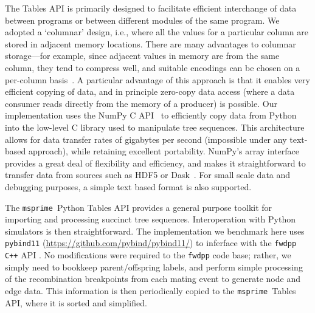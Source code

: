\documentclass{article}
\newcommand{\fwdpp}{\texttt{fwdpp}}
\newcommand{\cpp}{\texttt{C++}}
\newcommand{\msprime}{\texttt{msprime}}
\begin{document}
The Tables API is primarily designed to facilitate efficient interchange of
data between programs or between different modules of the same program. We
adopted a `columnar' design, i.e., where all the values for a
particular column are stored in adjacent memory locations.
There are many advantages to columnar storage---for example, since adjacent
values in memory are from the same column, they tend to compress well,
and suitable encodings can be chosen on a per-column basis~\citep{abadi2006integrating}.
A particular advantage of this approach is that it enables very
efficient copying of data, and in principle zero-copy data access
(where a data consumer reads directly from the memory of a producer) is possible.
Our implementation uses the NumPy C API~\citep{walt2011numpy} to efficiently copy
data from Python into the low-level C library used to manipulate tree sequences.
This architecture allows for data transfer rates of gigabytes per second
(impossible under any text-based approach), while retaining excellent portability.
NumPy's array interface provides a great deal of flexibility and efficiency,
and makes it straightforward to transfer data from sources
such as HDF5 \citep{hdf5}or Dask~\citep{dask}.
For small scale data and debugging purposes, a simple text based format is also supported.

The \msprime\ Python Tables API provides a general purpose toolkit for importing
and processing succinct tree sequences. Interoperation with Python simulators
is then straightforward.  The implementation we benchmark here uses
\texttt{pybind11} (\url{https://github.com/pybind/pybind11/}) to inferface
with the \fwdpp{} \cpp{} API \citep{fwdpp}. No modifications were
required to the \fwdpp{} code base; rather, we simply need to bookkeep parent/offspring labels,
and perform simple processing of the recombination breakpoints from each mating
event to generate node and edge data. This information is then periodically copied
to the \msprime\ Tables API, where it is sorted and simplified.
\end{document}
